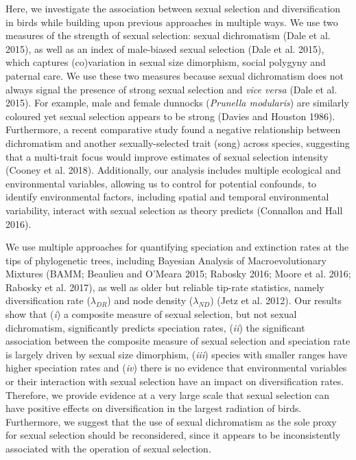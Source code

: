 \documentclass[]{article}
\begin{document}
Here, we investigate the association between sexual selection and
diversification in birds while building upon previous approaches in
multiple ways. We use two measures of the strength of sexual selection:
sexual dichromatism (Dale et al. 2015), as well as an index of
male-biased sexual selection (Dale et al. 2015), which captures
(co)variation in sexual size dimorphism, social polygyny and paternal
care. We use these two measures because sexual dichromatism does not
always signal the presence of strong sexual selection and \emph{vice
versa} (Dale et al. 2015). For example, male and female dunnocks
(\emph{Prunella modularis}) are similarly coloured yet sexual selection
appears to be strong (Davies and Houston 1986). Furthermore, a recent
comparative study found a negative relationship between dichromatism and
another sexually-selected trait (song) across species, suggesting that a
multi-trait focus would improve estimates of sexual selection intensity
(Cooney et al. 2018). Additionally, our analysis includes multiple
ecological and environmental variables, allowing us to control for
potential confounds, to identify environmental factors, including
spatial and temporal environmental variability, interact with sexual
selection as theory predicts (Connallon and Hall 2016).

We use multiple approaches for quantifying speciation and extinction
rates at the tips of phylogenetic trees, including Bayesian Analysis of
Macroevolutionary Mixtures (BAMM; Beaulieu and O'Meara 2015; Rabosky
2016; Moore et al. 2016; Rabosky et al. 2017), as well as older but
reliable tip-rate statistics, namely diversification rate
(\(\lambda_{DR}\)) and node density (\(\lambda_{ND}\)) (Jetz et al.
2012). Our results show that (\emph{i}) a composite measure of sexual
selection, but not sexual dichromatism, significantly predicts
speciation rates, (\emph{ii}) the significant association between the
composite measure of sexual selection and speciation rate is largely
driven by sexual size dimorphism, (\emph{iii}) species with smaller
ranges have higher speciation rates and (\emph{iv}) there is no evidence
that environmental variables or their interaction with sexual selection
have an impact on diversification rates. Therefore, we provide evidence
at a very large scale that sexual selection can have positive effects on
diversification in the largest radiation of birds. Furthermore, we
suggest that the use of sexual dichromatism as the sole proxy for sexual
selection should be reconsidered, since it appears to be inconsistently
associated with the operation of sexual selection.
\end{document}
